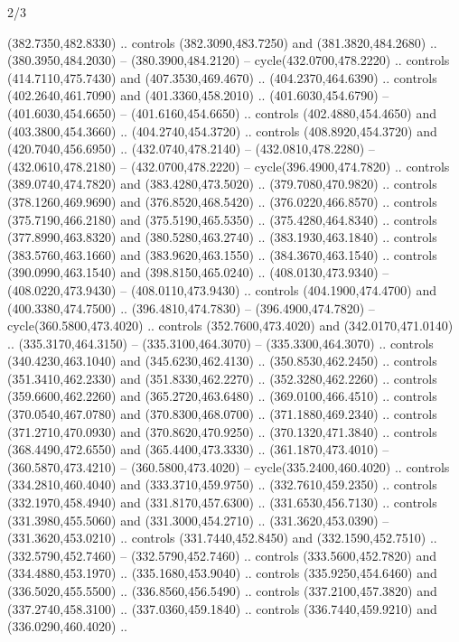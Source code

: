 \begin{flagdescription}{2/3}
\begin{scope}[xshift=0.5\flaglength]
\begin{scope}[scale=0.00209\flagwidth,yshift=170mm,xshift=-360]
\begin{scope}[y=-0.8pt, x=0.8pt, inner sep=0pt, outer sep=0pt]
  (382.7350,482.8330) .. controls (382.3090,483.7250) and (381.3820,484.2680) ..
  (380.3950,484.2030) -- (380.3900,484.2120) -- cycle(432.0700,478.2220) ..
  controls (414.7110,475.7430) and (407.3530,469.4670) .. (404.2370,464.6390) ..
  controls (402.2640,461.7090) and (401.3360,458.2010) .. (401.6030,454.6790) --
  (401.6030,454.6650) -- (401.6160,454.6650) .. controls (402.4880,454.4650) and
  (403.3800,454.3660) .. (404.2740,454.3720) .. controls (408.8920,454.3720) and
  (420.7040,456.6950) .. (432.0740,478.2140) -- (432.0810,478.2280) --
  (432.0610,478.2180) -- (432.0700,478.2220) -- cycle(396.4900,474.7820) ..
  controls (389.0740,474.7820) and (383.4280,473.5020) .. (379.7080,470.9820) ..
  controls (378.1260,469.9690) and (376.8520,468.5420) .. (376.0220,466.8570) ..
  controls (375.7190,466.2180) and (375.5190,465.5350) .. (375.4280,464.8340) ..
  controls (377.8990,463.8320) and (380.5280,463.2740) .. (383.1930,463.1840) ..
  controls (383.5760,463.1660) and (383.9620,463.1550) .. (384.3670,463.1540) ..
  controls (390.0990,463.1540) and (398.8150,465.0240) .. (408.0130,473.9340) --
  (408.0220,473.9430) -- (408.0110,473.9430) .. controls (404.1900,474.4700) and
  (400.3380,474.7500) .. (396.4810,474.7830) -- (396.4900,474.7820) --
  cycle(360.5800,473.4020) .. controls (352.7600,473.4020) and
  (342.0170,471.0140) .. (335.3170,464.3150) -- (335.3100,464.3070) --
  (335.3300,464.3070) .. controls (340.4230,463.1040) and (345.6230,462.4130) ..
  (350.8530,462.2450) .. controls (351.3410,462.2330) and (351.8330,462.2270) ..
  (352.3280,462.2260) .. controls (359.6600,462.2260) and (365.2720,463.6480) ..
  (369.0100,466.4510) .. controls (370.0540,467.0780) and (370.8300,468.0700) ..
  (371.1880,469.2340) .. controls (371.2710,470.0930) and (370.8620,470.9250) ..
  (370.1320,471.3840) .. controls (368.4490,472.6550) and (365.4400,473.3330) ..
  (361.1870,473.4010) -- (360.5870,473.4210) -- (360.5800,473.4020) --
  cycle(335.2400,460.4020) .. controls (334.2810,460.4040) and
  (333.3710,459.9750) .. (332.7610,459.2350) .. controls (332.1970,458.4940) and
  (331.8170,457.6300) .. (331.6530,456.7130) .. controls (331.3980,455.5060) and
  (331.3000,454.2710) .. (331.3620,453.0390) -- (331.3620,453.0210) .. controls
  (331.7440,452.8450) and (332.1590,452.7510) .. (332.5790,452.7460) --
  (332.5790,452.7460) .. controls (333.5600,452.7820) and (334.4880,453.1970) ..
  (335.1680,453.9040) .. controls (335.9250,454.6460) and (336.5020,455.5500) ..
  (336.8560,456.5490) .. controls (337.2100,457.3820) and (337.2740,458.3100) ..
  (337.0360,459.1840) .. controls (336.7440,459.9210) and (336.0290,460.4020) ..

\end{scope}
\end{scope}
\end{scope}
\end{flagdescription}
